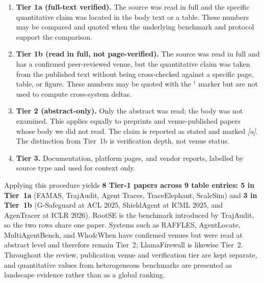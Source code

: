 \begin{enumerate}
\item \textbf{Tier 1a (full-text verified).} The source was read in full and the specific quantitative claim was located in the body text or a table. These numbers may be compared and quoted when the underlying benchmark and protocol support the comparison.
\item \textbf{Tier 1b (read in full, not page-verified).} The source was read in full and has a confirmed peer-reviewed venue, but the quantitative claim was taken from the published text without being cross-checked against a specific page, table, or figure. These numbers may be quoted with the $^\dagger$ marker but are not used to compute cross-system deltas.
\item \textbf{Tier 2 (abstract-only).} Only the abstract was read; the body was not examined. This applies equally to preprints and venue-published papers whose body we did not read. The claim is reported as stated and marked \emph{[a]}. The distinction from Tier~1b is verification depth, not venue status.
\item \textbf{Tier 3.} Documentation, platform pages, and vendor reports, labelled by source type and used for context only.
\end{enumerate}

Applying this procedure yields \textbf{8 Tier-1 papers across 9 table entries: 5 in Tier~1a} (FAMAS, TrajAudit, Agent Traces, TraceElephant, ScaleSim) and \textbf{3 in Tier~1b} (G-Safeguard at ACL 2025, ShieldAgent at ICML 2025, and AgenTracer at ICLR 2026). RootSE is the benchmark introduced by TrajAudit, so the two rows share one paper. Systems such as RAFFLES, AgentLocate, MultiAgentBench, and Who\&When have confirmed venues but were read at abstract level and therefore remain Tier~2; LlamaFirewall is likewise Tier~2. Throughout the review, publication venue and verification tier are kept separate, and quantitative values from heterogeneous benchmarks are presented as landscape evidence rather than as a global ranking.
